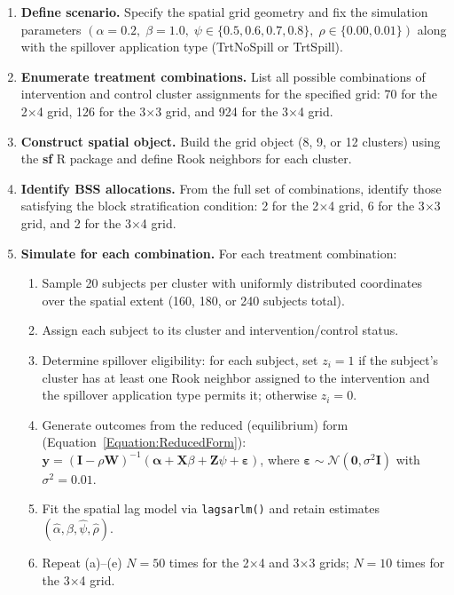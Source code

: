 \documentclass{article}[11pt]
\begin{document}
\begin{enumerate}
    \item\label{AppStep:Define} \textbf{Define scenario.} Specify the spatial grid geometry and fix the simulation parameters $(\alpha = 0.2,\; \beta = 1.0,\; \psi \in \{0.5, 0.6, 0.7, 0.8\},\; \rho \in \{0.00, 0.01\})$ along with the spillover application type (TrtNoSpill or TrtSpill).

    \item \textbf{Enumerate treatment combinations.} List all possible combinations of intervention and control cluster assignments for the specified grid: 70 for the 2$\times$4 grid, 126 for the 3$\times$3 grid, and 924 for the 3$\times$4 grid.

    \item \textbf{Construct spatial object.} Build the grid object (8, 9, or 12 clusters) using the \textbf{sf} R package\cite{pebesma_simple_2018} and define Rook neighbors for each cluster.

    \item \textbf{Identify BSS allocations.} From the full set of combinations, identify those satisfying the block stratification condition: 2 for the 2$\times$4 grid, 6 for the 3$\times$3 grid, and 2 for the 3$\times$4 grid.

    \item\label{AppStep:Sim} \textbf{Simulate for each combination.} For each treatment combination:
    \begin{enumerate}
        \item Sample 20 subjects per cluster with uniformly distributed coordinates over the spatial extent (160, 180, or 240 subjects total).
        \item Assign each subject to its cluster and intervention/control status.
        \item Determine spillover eligibility: for each subject, set $z_i = 1$ if the subject's cluster has at least one Rook neighbor assigned to the intervention and the spillover application type permits it; otherwise $z_i = 0$.
        \item Generate outcomes from the reduced (equilibrium) form (Equation~\ref{Equation:ReducedForm}): $\mathbf{y} = (\mathbf{I}-\rho \mathbf{W})^{-1}(\boldsymbol\alpha + \mathbf{X}\beta + \mathbf{Z}\psi + \boldsymbol\varepsilon)$, where $\boldsymbol\varepsilon \sim \mathcal{N}(\mathbf{0}, \sigma^2\mathbf{I})$ with $\sigma^2 = 0.01$.
        \item Fit the spatial lag model via \texttt{lagsarlm()} and retain estimates $(\hat\alpha, \hat\beta, \hat\psi, \hat\rho)$.
        \item Repeat (a)--(e) $N = 50$ times for the 2$\times$4 and 3$\times$3 grids; $N = 10$ times for the 3$\times$4 grid.
    \end{enumerate}


\end{enumerate}
\end{document}
